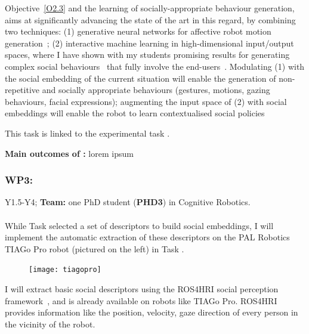 Objective~\ref{O2.3} and the learning of socially-appropriate behaviour
generation, \project aims at significantly advancing the state of the art in
this regard, by combining two techniques: (1) generative neural networks
for affective robot motion
generation~\cite{marmpena2019generating,suguitan2020moveae}; (2) interactive
machine learning in high-dimensional input/output spaces, where I have shown
with my students promising results for generating complex social
behaviours~\cite{senft2019teaching, winkle2020couch} that fully involve the
end-users~\cite{winkle2018social}. Modulating (1) with the social embedding of
the current situation will enable the generation of non-repetitive and socially
appropriate behaviours (gestures, motions, gazing behaviours, facial
expressions); augmenting the input space of (2) with social embeddings will
enable the robot to learn contextualised social policies

This task is linked to the experimental task \tDD.

\begin{framed}
    {\noindent\bf Main outcomes of \tBB:} lorem ipsum 
\end{framed}


\subsubsection{WP3: \textbf{\WPC}}

\begin{framed}
 Y1.5-Y4; {\bf Team:} one PhD student ({\bf PHD3}) in Cognitive Robotics.
\end{framed}

\paragraph{\TCA}

While Task \tAA selected a set of descriptors to build social embeddings, I will
implement the automatic extraction of these descriptors on the PAL Robotics
TIAGo Pro robot (pictured on the left) in Task \TCA.

\begin{figure}
    \centering
    \vspace{-10pt}
    \texttt{[image: tiagopro]}
    \label{fig:tiagopro}
\end{figure}


I will extract basic social descriptors using the ROS4HRI social perception
framework~\cite{lemaignan2022ros}, and is already available on robots like
TIAGo Pro. ROS4HRI provides information like the position, velocity, gaze
direction of every person in the vicinity of the robot. 

